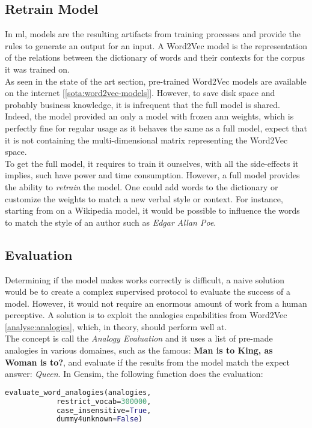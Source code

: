 \subsection{Retrain Model}
In \gls{ml}, models are the resulting artifacts from training processes and provide the rules to generate an output for an input. A Word2Vec model is the representation of the relations between the dictionary of words and their contexts for the corpus it was trained on.\\

As seen in the state of the art section, pre-trained Word2Vec models are available on the internet [\ref{sota:word2vec-models}]. However, to save disk space and probably business knowledge, it is infrequent that the full model is shared. Indeed, the model provided an only a model with frozen \gls{ann} weights, which is perfectly fine for regular usage as it behaves the same as a full model, expect that it is not containing the multi-dimensional matrix representing the Word2Vec space.\\

To get the full model, it requires to train it ourselves, with all the side-effects it implies, such have power and time consumption. However, a full model provides the ability to \textit{retrain} the model. One could add words to the dictionary or customize the weights to match a new verbal style or context. For instance, starting from on a Wikipedia model, it would be possible to influence the words to match the style of an author such as \textit{Edgar Allan Poe}.


\subsection{Evaluation}
Determining if the model makes works correctly is difficult, a naive solution would be to create a complex supervised protocol to evaluate the success of a model. However, it would not require an enormous amount of work from a human perceptive. A solution is to exploit the analogies capabilities from Word2Vec \ref{analyse:analogies}, which, in theory, should perform well at.\\

The concept is call the \textit{Analogy Evaluation} and it uses a list of pre-made analogies in various domaines, such as the famous: \textbf{Man is to King, as Woman is to?}, and evaluate if the results from the model match the expect answer: \textit{Queen}. In Gensim, the following function does the evaluation: 
\begin{lstlisting}[language=Python]
evaluate_word_analogies(analogies,
            restrict_vocab=300000,
            case_insensitive=True,
            dummy4unknown=False)
\end{lstlisting}
\vspace{1em}

